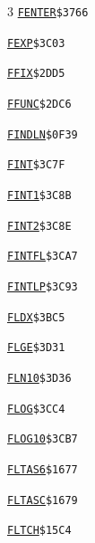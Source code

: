 \begin{multicols}{3}
\noindent\hyperlink{l:FENTER}{\texttt{FENTER}}\hfill\texttt{\$3766~\phantom{000}\llap{\pageref{l:FENTER}}}\par
\noindent\hyperlink{l:FEXP}{\texttt{FEXP}}\hfill\texttt{\$3C03~\phantom{000}\llap{\pageref{l:FEXP}}}\par
\noindent\hyperlink{l:FFIX}{\texttt{FFIX}}\hfill\texttt{\$2DD5~\phantom{000}\llap{\pageref{l:FFIX}}}\par
\noindent\hyperlink{l:FFUNC}{\texttt{FFUNC}}\hfill\texttt{\$2DC6~\phantom{000}\llap{\pageref{l:FFUNC}}}\par
\noindent\hyperlink{l:FINDLN}{\texttt{FINDLN}}\hfill\texttt{\$0F39~\phantom{000}\llap{\pageref{l:FINDLN}}}\par
\noindent\hyperlink{l:FINT}{\texttt{FINT}}\hfill\texttt{\$3C7F~\phantom{000}\llap{\pageref{l:FINT}}}\par
\noindent\hyperlink{l:FINT1}{\texttt{FINT1}}\hfill\texttt{\$3C8B~\phantom{000}\llap{\pageref{l:FINT1}}}\par
\noindent\hyperlink{l:FINT2}{\texttt{FINT2}}\hfill\texttt{\$3C8E~\phantom{000}\llap{\pageref{l:FINT2}}}\par
\noindent\hyperlink{l:FINTFL}{\texttt{FINTFL}}\hfill\texttt{\$3CA7~\phantom{000}\llap{\pageref{l:FINTFL}}}\par
\noindent\hyperlink{l:FINTLP}{\texttt{FINTLP}}\hfill\texttt{\$3C93~\phantom{000}\llap{\pageref{l:FINTLP}}}\par
\noindent\hyperlink{l:FLDX}{\texttt{FLDX}}\hfill\texttt{\$3BC5~\phantom{000}\llap{\pageref{l:FLDX}}}\par
\noindent\hyperlink{l:FLGE}{\texttt{FLGE}}\hfill\texttt{\$3D31~\phantom{000}\llap{\pageref{l:FLGE}}}\par
\noindent\hyperlink{l:FLN10}{\texttt{FLN10}}\hfill\texttt{\$3D36~\phantom{000}\llap{\pageref{l:FLN10}}}\par
\noindent\hyperlink{l:FLOG}{\texttt{FLOG}}\hfill\texttt{\$3CC4~\phantom{000}\llap{\pageref{l:FLOG}}}\par
\noindent\hyperlink{l:FLOG10}{\texttt{FLOG10}}\hfill\texttt{\$3CB7~\phantom{000}\llap{\pageref{l:FLOG10}}}\par
\noindent\hyperlink{l:FLTAS6}{\texttt{FLTAS6}}\hfill\texttt{\$1677~\phantom{000}\llap{\pageref{l:FLTAS6}}}\par
\noindent\hyperlink{l:FLTASC}{\texttt{FLTASC}}\hfill\texttt{\$1679~\phantom{000}\llap{\pageref{l:FLTASC}}}\par
\noindent\hyperlink{l:FLTCH}{\texttt{FLTCH}}\hfill\texttt{\$15C4~\phantom{000}\llap{\pageref{l:FLTCH}}}\par

\end{multicols}
